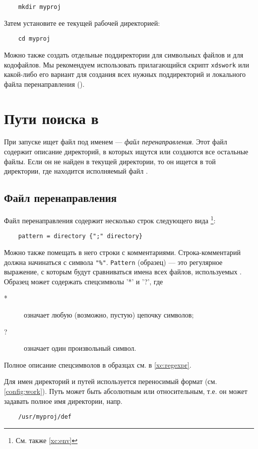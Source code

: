 \verb'    mkdir myproj'

Затем установите ее текущей рабочей директорией:

\verb'    cd myproj'

Можно также создать отдельные поддиректории для символьных файлов
и для кодофайлов. Мы рекомендуем использовать прилагающийся скрипт
{\tt xdswork} или какой-либо его вариант для создания всех нужных
поддиректорий и локального файла перенаправления ({\tt \red}).

\section{Пути поиска в \XDS{}}

При запуске \xds{} ищет файл под именем {\tt \red} --- 
{\em файл перенаправления}. Этот файл содержит описание директорий,
в которых ищутся или создаются все остальные файлы.
Если он не найден в текущей директории, то он ищется в той директории,
где находится исполняемый файл \xds{}.

\subsection{Файл перенаправления}\label{xc:red}

Файл перенаправления содержит несколько строк следующего вида
\footnote{См. также \ref{xc:env}}:

\verb'    pattern = directory {";" directory}'

Можно также помещать в него строки с комментариями.
Строка-комментарий должна начинаться с символа \verb|"%"|. {\tt Pattern}
(образец) --- это регулярное выражение, с которым будут сравниваться имена
всех файлов, используемых \xds{}.
Образец может содержать спецсимволы '*' и '?', где
\begin{description}
\item[*] означает любую (возможно, пустую) цепочку символов;
\item[?] означает один произвольный символ.
\end{description}
Полное описание спецсимволов в образцах см. в \ref{xc:regexpr}.

Для имен директорий и путей используется переносимый формат
(см. \ref{config:work}).
Путь может быть абсолютным или относительным, т.е. он может
задавать полное имя директории, напр.

\verb'    /usr/myproj/def'

